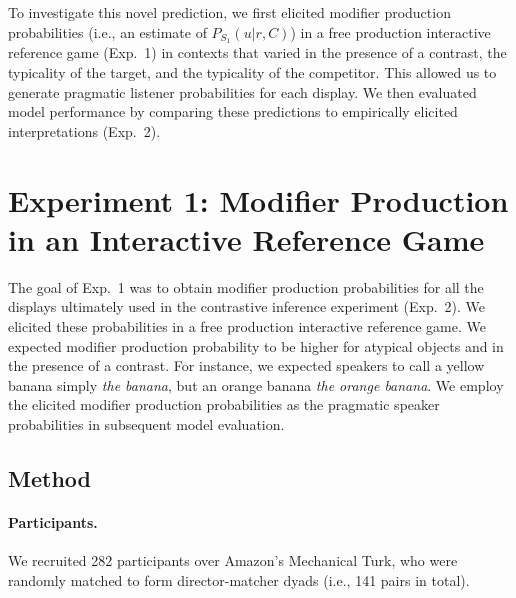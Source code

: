\documentclass[10pt,letterpaper]{article}
\newcommand{\jd}[1]{\textcolor{Purple}{[jd: #1]}}
\begin{document}

To investigate this novel prediction, we first elicited modifier production probabilities (i.e., an estimate of $P_{S_1}(u|r,C)$) in a free production interactive reference game (Exp.~1) in contexts that varied in the presence of a contrast, the typicality of the target, and the typicality of the competitor. This allowed us to generate pragmatic listener probabilities for each display. We then evaluated model performance by comparing these predictions to empirically elicited interpretations (Exp.~2).


\section{Experiment 1: Modifier Production in an Interactive Reference Game}

The goal of Exp.~1 was to obtain modifier production probabilities for all the displays ultimately used in the contrastive inference experiment (Exp.~2). We elicited these probabilities in a free production interactive reference game. We expected modifier production probability to be higher for atypical objects and in the presence of a contrast. For instance, we expected speakers to call a yellow banana simply \textit{the banana}, but an orange banana \textit{the orange banana}. We employ the elicited modifier production probabilities as the pragmatic speaker probabilities in subsequent model evaluation.

\subsection{Method}

\paragraph{Participants.} We recruited 282 participants over Amazon's Mechanical Turk, who were randomly matched to form director-matcher dyads (i.e., 141 pairs in total).%
\end{document}
